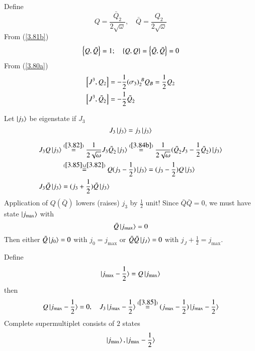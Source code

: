 Define 
\begin{equation}
   Q = \frac{\bar{Q}_{\dot{2}}}{2\sqrt{\omega}}, \quad \bar{Q} = \frac{Q_2}{2 \sqrt{\omega}} \label{3.82}
\end{equation}
From (\ref{3.81b})
\begin{equation}
   \acomm{Q}{\bar{Q}} = 1;\quad \acomm{Q}{Q} = \acomm{\bar{Q}}{\bar{Q}} = 0 \label{3.83}
\end{equation}
From (\ref{3.80a})
\begin{subequations}
   \label{3.84}
  \begin{align}
     \comm{J^3}{Q_2} &= - \frac{1}{2} (\sigma_3)^{\ B}_2 Q_B = \frac{1}{2} Q_2 \label{3.84a} \\
     \comm{J^3}{\bar{Q}_{\dot{2}}} &= - \frac{1}{2} \bar{Q}_{\dot{2}} \label{3.84b}
  \end{align} 
\end{subequations}

Let $\ket{j_3}$ be eigenstate if $J_3$
\begin{equation}
   J_3 \ket{j_3} = j_3 \ket{j_3} \label{3.85}
\end{equation}

\begin{subequations}
   \label{3.86}
  \begin{align}
     J_3 Q \ket{j_3} &\stackrel{(\ref{3.82})}{=} \frac{1}{2 \sqrt{\omega}} J_3 \bar{Q}_{\dot{2}} \ket{j_3} \stackrel{(\ref{3.84b})}{=} \frac{1}{2\sqrt{\omega}} (\bar{Q}_{\dot{2}}J_3 - \frac{1}{2} \bar{Q}_{\dot{2}}) \ket{j_3} \notag \\
                     & \stackrel{(\ref{3.85}), (\ref{3.82})}{=} Q (j_3 - \frac{1}{2}) \ket{j_3} = (j_3 - \frac{1}{2}) Q \ket{j_3} \label{3.86a} \\
     J_3 \bar{Q} \ket{j_3} &= (j_3 + \frac{1}{2}) \bar{Q} \ket{j_3} \label{3.86b}
  \end{align} 
\end{subequations}
Application of $Q (\bar{Q})$ lowers (raises) $j_3$ by $\frac{1}{2}$ unit! Since $\bar{Q} \bar{Q} =0$, we must have state $\ket{j_\text{max}}$ with
\begin{equation}
   \bar{Q} \ket{j_\text{max}} = 0 \label{3.87}
\end{equation}
Then either $\bar{Q} \ket{j_0} = 0$ with $j_0 = j_\text{max}$ or $\bar{Q}\bar{Q} \ket{j_J} = 0$ with $j_J + \frac{1}{2} = j_\text{max}$.

Define
\begin{equation}
   \ket{j_\text{max} - \frac{1}{2}} = Q \ket{j_\text{max}} \label{3.88}
\end{equation}
then
\begin{equation*}
   Q \ket{j_\text{max} - \frac{1}{2}} = 0, \quad J_3 \ket{j_\text{max} - \frac{1}{2}} \stackrel{(\ref{3.85})}{=} (j_\text{max} - \frac{1}{2}) \ket{j_\text{max} - \frac{1}{2}}
\end{equation*}
Complete supermultiplet consists of $2$ states
\begin{equation}
   \ket{j_\text{max}}, \ket{j_\text{max} - \frac{1}{2}}
\end{equation}

